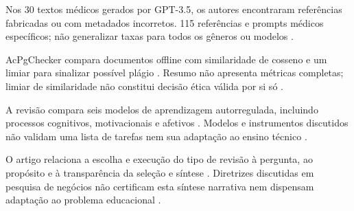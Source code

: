 Nos 30 textos médicos gerados por GPT-3.5, os autores encontraram referências fabricadas ou com metadados incorretos. 115 referências e prompts médicos específicos; não generalizar taxas para todos os gêneros ou modelos \citep{SU07}.

AcPgChecker compara documentos offline com similaridade de cosseno e um limiar para sinalizar possível plágio \citep{SU08}. Resumo não apresenta métricas completas; limiar de similaridade não constitui decisão ética válida por si só \citep{SU08}.

A revisão compara seis modelos de aprendizagem autorregulada, incluindo processos cognitivos, motivacionais e afetivos \citep{SU10}. Modelos e instrumentos discutidos não validam uma lista de tarefas nem sua adaptação ao ensino técnico \citep{SU10}.

O artigo relaciona a escolha e execução do tipo de revisão à pergunta, ao propósito e à transparência da seleção e síntese \citep{SU11}. Diretrizes discutidas em pesquisa de negócios não certificam esta síntese narrativa nem dispensam adaptação ao problema educacional \citep{SU11}.